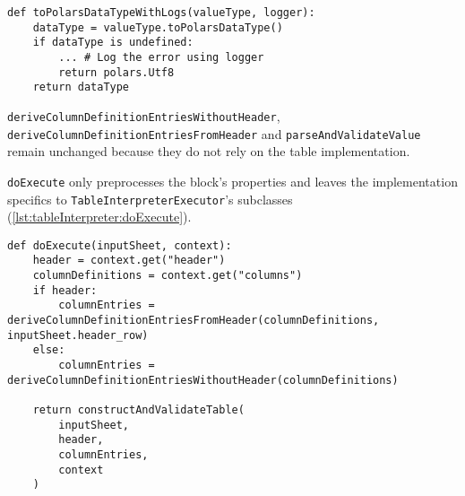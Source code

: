 \begin{listing}
	\begin{verbatim}
def toPolarsDataTypeWithLogs(valueType, logger):
	dataType = valueType.toPolarsDataType()
	if dataType is undefined:
		... # Log the error using logger
		return polars.Utf8
	return dataType
	\end{verbatim}
	\caption{Pseudocode of the \Verb|toPolarsDataTypeFunction|}
	\label{lst:toPolarsDataTypeWithLogs}
\end{listing}


\Verb|deriveColumnDefinitionEntriesWithoutHeader|, \Verb|deriveColumnDefinitionEntriesFromHeader| and \Verb|parseAndValidateValue| remain unchanged because they do not rely on the table implementation.

%

\Verb|doExecute| only preprocesses the block's properties and leaves the implementation specifics to \Verb|TableInterpreterExecutor|'s subclasses (\ref{lst:tableInterpreter:doExecute}).
\begin{listing}
	\begin{verbatim}
def doExecute(inputSheet, context):
	header = context.get("header")
	columnDefinitions = context.get("columns")
	if header:
		columnEntries = deriveColumnDefinitionEntriesFromHeader(columnDefinitions, inputSheet.header_row)
	else:
		columnEntries = deriveColumnDefinitionEntriesWithoutHeader(columnDefinitions)

	return constructAndValidateTable(
		inputSheet,
		header,
		columnEntries,
		context
	)
	\end{verbatim}
	\caption{Pseudocode for \Verb|TableInterpreter.doExecute|}
	\label{lst:tableInterpreter:doExecute}
\end{listing}

